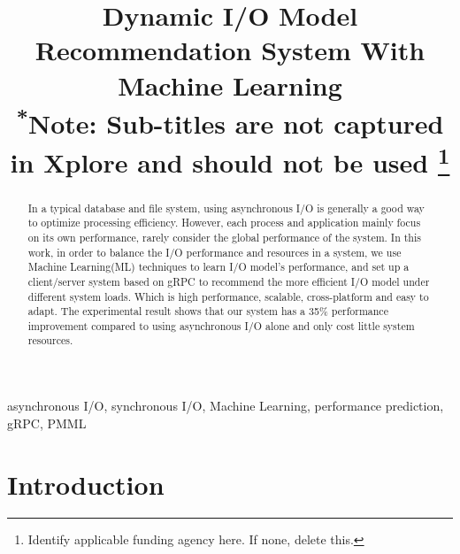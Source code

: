 \documentclass[conference]{IEEEtran}
\begin{document}
\title{Dynamic I/O Model Recommendation System With Machine Learning\\
{\footnotesize \textsuperscript{*}Note: Sub-titles are not captured in Xplore and
should not be used}
\thanks{Identify applicable funding agency here. If none, delete this.}
}

\author{
	\and
}

\maketitle

\begin{abstract}
	In a typical database and file system, using asynchronous I/O is generally a good way to optimize processing efficiency.
	However, each process and application mainly focus on its own performance, rarely consider the global performance of the system.
	In this work, in order to balance the I/O performance and resources in a system, we use Machine Learning(ML) techniques to learn I/O model's performance,
	and set up a client/server system based on gRPC to recommend the more efficient I/O model under different system loads. Which is high performance, scalable, cross-platform and easy to adapt.
	The experimental result shows that our system has a 35\% performance improvement compared to using asynchronous I/O alone and only cost little system resources.

\end{abstract}

\renewcommand\IEEEkeywordsname{Keywords}
\begin{IEEEkeywords}
	asynchronous I/O, synchronous I/O, Machine Learning, performance prediction, gRPC, PMML
\end{IEEEkeywords}

\section{Introduction}
\end{document}
